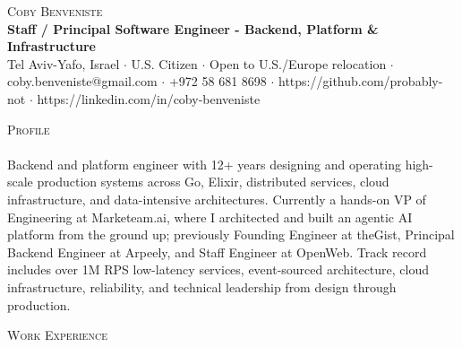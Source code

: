 \documentclass[a4paper]{article}
\newcommand{\lineunder} {
    \vspace*{-8pt} \\
    \hspace*{-18pt} \hrulefill \\
}
\newcommand{\header} [1] {
    {\hspace*{-18pt}\vspace*{6pt} \textsc{#1}}
    \vspace*{-6pt} \lineunder
}
\begin{document}
\vspace*{-40pt}

\vspace*{-10pt}
\begin{center}
	{\Huge \scshape {Coby Benveniste}}\\
	{\large \textbf{Staff / Principal Software Engineer - Backend, Platform \& Infrastructure}}\\
	{\small Tel Aviv-Yafo, Israel $\cdot$ U.S. Citizen $\cdot$ Open to U.S./Europe relocation $\cdot$ coby.benveniste@gmail.com $\cdot$ +972 58 681 8698 $\cdot$ https://github.com/probably-not $\cdot$ https://linkedin.com/in/coby-benveniste}\\
\end{center}

\header{Profile}
Backend and platform engineer with 12+ years designing and operating high-scale production systems across Go, Elixir, distributed services, cloud infrastructure, and data-intensive architectures. Currently a hands-on VP of Engineering at Marketeam.ai, where I architected and built an agentic AI platform from the ground up; previously Founding Engineer at theGist, Principal Backend Engineer at Arpeely, and Staff Engineer at OpenWeb. Track record includes over 1M RPS low-latency services, event-sourced architecture, cloud infrastructure, reliability, and technical leadership from design through production.\\
\vspace{1mm}

\header{Work Experience}
\vspace{1mm}
\end{document}
